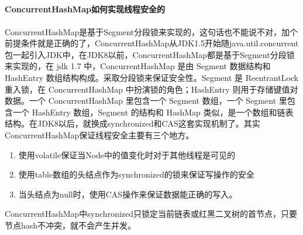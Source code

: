 \documentclass[../../../interview-questions.tex]{subfiles}
\begin{document}
\subsection{\color{red}{ConcurrentHashMap}}

\paragraph{ConcurrentHashMap如何实现线程安全的}

ConcurrentHashMap是基于Segment分段锁来实现的，这句话也不能说不对，加个前提条件就是正确的了，ConcurrentHashMap从JDK1.5开始随java.util.concurrent包一起引入JDK中，在JDK8以前，ConcurrentHashMap都是基于Segment分段锁来实现的，在 jdk 1.7 中，ConcurrentHashMap 是由 Segment 数据结构和 HashEntry 数组结构构成。采取分段锁来保证安全性。Segment 是 ReentrantLock 重入锁，在 ConcurrentHashMap 中扮演锁的角色；HashEntry 则用于存储键值对数据。一个 ConcurrentHashMap 里包含一个 Segment 数组，一个 Segment 里包含一个 HashEntry 数组，Segment 的结构和 HashMap 类似，是一个数组和链表结构。在JDK8以后，就换成synchronized和CAS这套实现机制了。其实ConcurrentHashMap保证线程安全主要有三个地方。

\begin{enumerate}
    \item {使用volatile保证当Node中的值变化时对于其他线程是可见的}
    \item {使用table数组的头结点作为synchronized的锁来保证写操作的安全}
    \item {当头结点为null时，使用CAS操作来保证数据能正确的写入。}
\end{enumerate}

ConcurrentHashMap中synchronized只锁定当前链表或红黑二叉树的首节点，只要节点hash不冲突，就不会产生并发。
\end{document}
